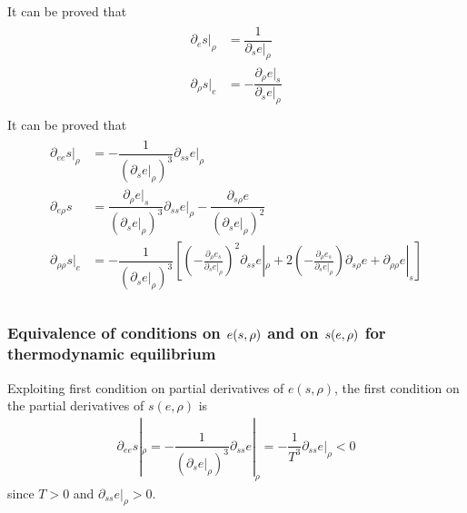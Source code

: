 \documentclass[letterpaper,10pt,english]{jupyterBook}
\begin{document}
\sphinxAtStartPar
{} It can be proved that
\begin{equation*}
\begin{split}\begin{aligned}
  \partial_e s |_{\rho} & = \dfrac{1}{\partial_s e |_{\rho}} \\
  \partial_{\rho} s |_e & = - \dfrac{\partial_{\rho} e |_{s}}{\partial_s e |_{\rho}} \\
\end{aligned}\end{split}
\end{equation*}
\sphinxAtStartPar
{} It can be proved that
\begin{equation*}
\begin{split}\begin{aligned}
  \partial_{ee}       s|_{\rho} & = - \dfrac{1}{\left( \partial_s e|_{\rho} \right)^3} \partial_{ss} e |_{\rho} \\
  \partial_{e\rho}    s         & =   \dfrac{\partial_{\rho} e|_s}{\left( \partial_s e|_{\rho} \right)^3} \partial_{ss} e |_{\rho} - \dfrac{\partial_{s \rho} e}{(\partial_s e|_{\rho})^2} \\
  \partial_{\rho\rho} s|_{e}    & = - \dfrac{1}{\left( \partial_s e|_{\rho} \right)^3} \left[ \left( -\frac{\partial_\rho e_s}{\partial_s e|_\rho} \right)^2 \partial_{ss} e |_{\rho} + 2 \left(-\frac{\partial_\rho e_s}{\partial_s e|_\rho}\right) \partial_{s \rho} e + \partial_{\rho \rho} e|_s  \right] \\
\end{aligned}\end{split}
\end{equation*}\subsubsection*{Equivalence of conditions on \protect\(e(s, \rho)\protect\) and on \protect\(s(e, \rho)\protect\) for thermodynamic equilibrium}

\sphinxAtStartPar
Exploiting first condition on partial derivatives of \(e(s,\rho)\), the first condition on the partial derivatives of \(s(e,\rho)\) is
\begin{equation*}
\begin{split}\partial_{ee} s|_{\rho} = - \dfrac{1}{\left( \partial_s e|_{\rho} \right)^3} \partial_{ss} e |_{\rho} = - \dfrac{1}{T^3} \partial_{ss} e |_{\rho}< 0 \end{split}
\end{equation*}
\sphinxAtStartPar
since \(T > 0\) and \(\partial_{ss} e|_{\rho} > 0\).
\end{document}
